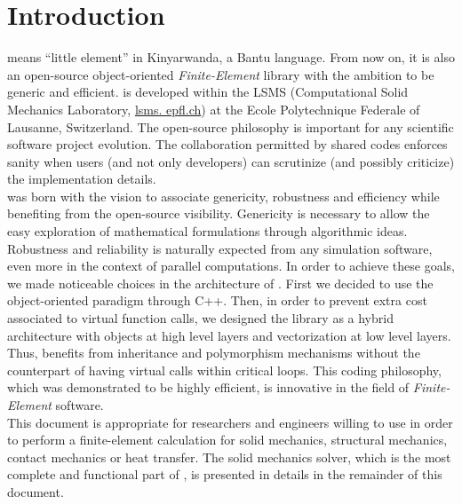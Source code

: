 \chapter{Introduction}

\akantu means ``little element'' in Kinyarwanda, a Bantu
language. From now on, it is also an open-source object-oriented
\emph{Finite-Element} library with the ambition to be generic and
efficient.  \akantu is developed within the LSMS (Computational Solid
Mechanics Laboratory, \url{lsms.  epfl.ch}) at the Ecole Polytechnique
Federale of Lausanne, Switzerland. The open-source philosophy is
important for any scientific software project evolution. The
collaboration permitted by shared codes enforces sanity when users
(and not only developers) can scrutinize (and possibly criticize) the
implementation details. \\

\akantu was born with the vision to associate genericity, robustness
and efficiency while benefiting from the open-source
visibility. Genericity is necessary to allow the easy exploration of
mathematical formulations through algorithmic ideas. Robustness and
reliability is naturally expected from any simulation software, even
more in the context of parallel computations.  In order to achieve
these goals, we made noticeable choices in the architecture of
\akantu. First we decided to use the object-oriented paradigm through
C++. Then, in order to prevent extra cost associated to virtual
function calls, we designed the library as a hybrid architecture with
objects at high level layers and vectorization at low level
layers. Thus, \akantu benefits from inheritance and polymorphism
mechanisms without the counterpart of having virtual calls within
critical loops.  This coding philosophy, which was demonstrated to be
highly efficient, is innovative in the field of
\textit{Finite-Element} software. \\

This document is appropriate for researchers and engineers willing to
use \akantu in order to perform a finite-element calculation for solid
mechanics, structural mechanics, contact mechanics or heat
transfer. The solid mechanics solver, which is the most complete and
functional part of \akantu, is presented in details in the remainder
of this document.


